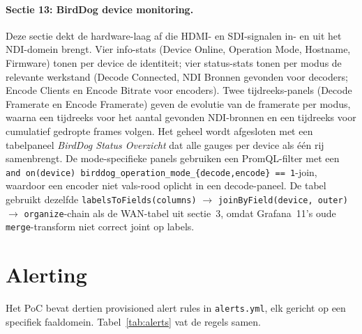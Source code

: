 \paragraph{Sectie 13: BirdDog device monitoring.} Deze sectie dekt de hardware-laag af die HDMI- en SDI-signalen in- en uit het NDI-domein brengt. Vier info-stats (Device Online, Operation Mode, Hostname, Firmware) tonen per device de identiteit; vier status-stats tonen per modus de relevante werkstand (Decode Connected, NDI Bronnen gevonden voor decoders; Encode Clients en Encode Bitrate voor encoders). Twee tijdreeks-panels (Decode Framerate en Encode Framerate) geven de evolutie van de framerate per modus, waarna een tijdreeks voor het aantal gevonden NDI-bronnen en een tijdreeks voor cumulatief gedropte frames volgen. Het geheel wordt afgesloten met een tabelpaneel \emph{BirdDog Status Overzicht} dat alle gauges per device als één rij samenbrengt. De mode-specifieke panels gebruiken een PromQL-filter met een \texttt{and on(device) birddog\_operation\_mode\_\{decode,encode\} == 1}-join, waardoor een encoder niet vals-rood oplicht in een decode-paneel. De tabel gebruikt dezelfde \texttt{labelsToFields(columns)} $\rightarrow$ \texttt{joinByField(device, outer)} $\rightarrow$ \texttt{organize}-chain als de WAN-tabel uit sectie~3, omdat Grafana~11's oude \texttt{merge}-transform niet correct joint op labels.

\section{Alerting}
\label{sec:poc-alerting}

Het PoC bevat dertien provisioned alert rules in \texttt{alerts.yml}, elk gericht op een specifiek faaldomein. Tabel~\ref{tab:alerts} vat de regels samen.

